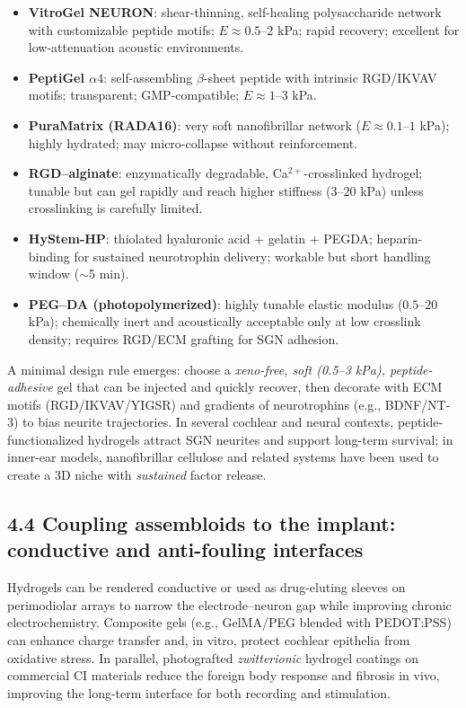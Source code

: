 \begin{itemize}
	\item \textbf{VitroGel\textsuperscript{\textregistered} NEURON}: shear-thinning, self-healing polysaccharide network with customizable peptide motifs; $E \approx 0.5$--$2$ kPa; rapid recovery; excellent for low-attenuation acoustic environments.\citep{Zine2021StemCells}
	\item \textbf{PeptiGel\textsuperscript{\textregistered} $\alpha 4$}: self-assembling $\beta$-sheet peptide with intrinsic RGD/IKVAV motifs; transparent; GMP-compatible; $E \approx 1$--$3$ kPa.\citep{Millesi2023ACSAMI}
	\item \textbf{PuraMatrix\textsuperscript{\textregistered} (RADA16)}: very soft nanofibrillar network ($E \approx 0.1$--$1$ kPa); highly hydrated; may micro-collapse without reinforcement.\citep{Zhong2010NNR}
	\item \textbf{RGD–alginate}: enzymatically degradable, Ca$^{2+}$-crosslinked hydrogel; tunable but can gel rapidly and reach higher stiffness ($3$--$20$ kPa) unless crosslinking is carefully limited.\citep{Mooney2011TEA}
	\item \textbf{HyStem-HP}: thiolated hyaluronic acid + gelatin + PEGDA; heparin-binding for sustained neurotrophin delivery; workable but short handling window ($\sim$5 min).\citep{Zhong2010NNR}
	\item \textbf{PEG–DA (photopolymerized)}: highly tunable elastic modulus ($0.5$--$20$ kPa); chemically inert and acoustically acceptable only at low crosslink density; requires RGD/ECM grafting for SGN adhesion.\citep{Mooney2011TEA}
\end{itemize}

A minimal design rule emerges: choose a \emph{xeno-free, soft (0.5--3 kPa), peptide-adhesive} gel that can be injected and quickly recover, then decorate with ECM motifs (RGD/IKVAV/YIGSR) and gradients of neurotrophins (e.g., BDNF/NT-3) to bias neurite trajectories. In several cochlear and neural contexts, peptide-functionalized hydrogels attract SGN neurites and support long-term survival; in inner-ear models, nanofibrillar cellulose and related systems have been used to create a 3D niche with \emph{sustained} factor release.\citep{Pancratov2017ColSurfB,Chang2020ActaBiomaterialia}

\subsection*{4.4 Coupling assembloids to the implant: conductive and anti-fouling interfaces}
Hydrogels can be rendered conductive or used as drug-eluting sleeves on perimodiolar arrays to narrow the electrode--neuron gap while improving chronic electrochemistry.\citep{Dalrymple2020JNE,Chikar2012Biomaterials} Composite gels (e.g., GelMA/PEG blended with PEDOT:PSS) can enhance charge transfer and, in vitro, protect cochlear epithelia from oxidative stress.\citep{Tan2024Biomolecules} In parallel, photografted \emph{zwitterionic} hydrogel coatings on commercial CI materials reduce the foreign body response and fibrosis in vivo, improving the long-term interface for both recording and stimulation.\citep{Horne2023ActaBiomaterialia} 

